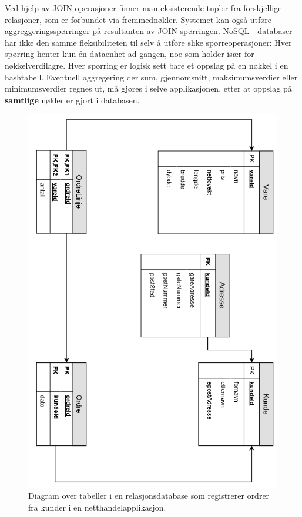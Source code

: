Ved hjelp av JOIN-operasjoner finner man eksisterende tupler fra forskjellige relasjoner, som er forbundet via fremmednøkler. Systemet kan også utføre aggreggeringsspørringer på resultanten av JOIN-spørringen. NoSQL - databaser har ikke den samme fleksibiliteten til selv å utføre slike spørreoperasjoner: Hver spørring henter kun én dataenhet ad gangen, noe som holder især for nøkkelverdilagre. Hver spørring er logisk sett bare et oppslag på en nøkkel i en hashtabell. Eventuell aggregering der sum, gjennomsnitt, maksimumsverdier eller minimumsverdier regnes ut, må gjøres i selve applikasjonen, etter at oppslag på \textbf{samtlige} nøkler er gjort i databasen.

\begin{figure}[!ht]
    \centering
    \includegraphics[scale=0.7]{fig/NettbutikkOrdreModell.png}
    \caption{Diagram over tabeller i en relasjonsdatabase som registrerer ordrer fra kunder i en netthandelapplikasjon.}
    \label{fig1}
\end{figure}
 
